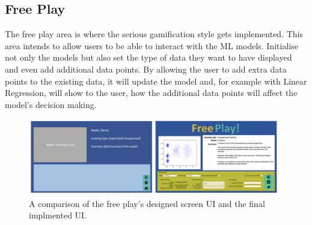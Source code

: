 	\subsection{Free Play}
	
	The free play area is where the serious gamification style gets implemented. This area intends to allow users to be able to interact with the ML models. Initialise not only the models but also set the type of data they want to have displayed and even add additional data points. By allowing the user to add extra data points to the existing data, it will update the model and, for example with Linear Regression, will show to the user, how the additional data points will affect the model's decision making.
	
	\begin{figure}[b]
		\begin{center}
			\includegraphics[width=11cm]{graphics/free_play.png}
			\caption{A comparison of the free play's designed screen UI and the final implmented UI.}
			\label{fig:ui_fp}
		\end{center}
	\end{figure}
	
